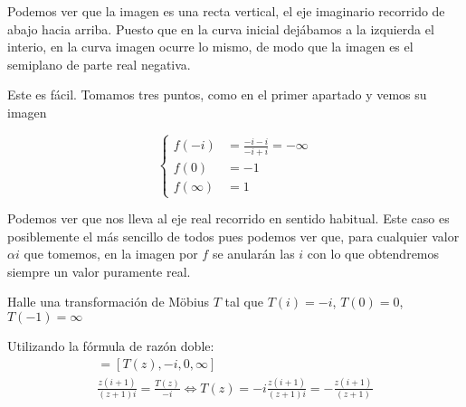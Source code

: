 \begin{problem}[7]
Podemos ver que la imagen es una recta vertical, el eje imaginario recorrido de abajo hacia arriba. Puesto que en la curva inicial dejábamos a la izquierda el interio, en la curva imagen ocurre lo mismo, de modo que la imagen es el semiplano de parte real negativa.

\spart

Este es fácil. Tomamos tres puntos, como en el primer apartado y vemos su imagen

\[\left\{\begin{aligned}
f(-i)&=\frac{-i-i}{-i+i}=-\infty\\
f(0)&=-1\\
f(\infty)&=1
\end{aligned}\right.\]

Podemos ver que nos lleva al eje real recorrido en sentido habitual. Este caso es posiblemente el más sencillo de todos pues podemos ver que, para cualquier valor $αi$ que tomemos, en la imagen por $f$ se anularán las $i$ con lo que obtendremos siempre un valor puramente real.
\end{problem}

\begin{problem}[8]
Halle una transformación de Möbius $T$ tal que $T(i) = -i$, $T(0) = 0$, $T(-1) = \infty$
\solution
{}

Utilizando la fórmula de razón doble:
\begin{gather*}
[z,i,0,-1] = [T(z),-i,0,\infty]\\
\frac{z(i + 1)}{(z + 1)i} = \frac{T(z)}{-i} \iff T(z) = -i \frac{z(i + 1)}{(z + 1)i} = -\frac{z(i + 1)}{(z + 1)}
\end{gather*}

\end{problem}

